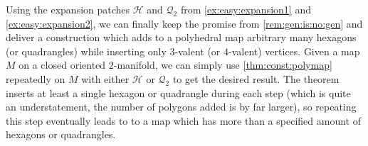 \begin{example}\label{ex:easy:expansion3}
  Using the expansion patches $\mathcal{H}$ and $\mathcal{Q}_2$ from \autoref{ex:easy:expansion1} and \autoref{ex:easy:expansion2}, we can finally keep the promise from \autoref{rem:gen:is:no:gen} and deliver a construction which adds to a polyhedral map arbitrary many hexagons (or quadrangles) while inserting only $3$-valent (or $4$-valent) vertices. Given a map $M$ on a closed oriented $2$-manifold, we can simply use \autoref{thm:const:polymap} repeatedly on $M$ with either $\mathcal{H}$ or $\mathcal{Q}_2$ to get the desired result. The theorem inserts at least a single hexagon or quadrangle during each step (which is quite an understatement, the number of polygons added is by far larger), so repeating this step eventually leads to to a map which has more than a specified amount of hexagons or quadrangles.
\end{example}

